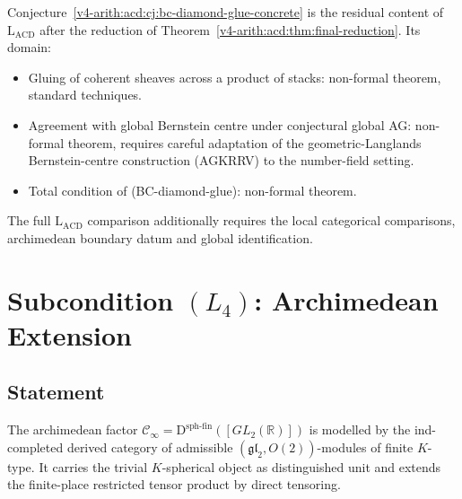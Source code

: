 \begin{remark}
\label{v4-arith:acd:rem:L3-residual-domain}
Conjecture~\ref{v4-arith:acd:cj:bc-diamond-glue-concrete} is the residual
content of \(\mathrm{L}_{\mathrm{ACD}}\) after the reduction of
Theorem~\ref{v4-arith:acd:thm:final-reduction}. Its domain:
\begin{itemize}
\item Gluing of coherent sheaves across a product of stacks:
non-formal theorem, standard techniques.
\item Agreement with global Bernstein centre under conjectural
global AG: non-formal theorem, requires careful adaptation of
the geometric-Langlands Bernstein-centre construction (AGKRRV) to the
number-field setting.
\item Total condition of (BC-diamond-glue): non-formal theorem.
\end{itemize}
The full \(\mathrm{L}_{\mathrm{ACD}}\) comparison additionally requires
the local categorical comparisons, archimedean boundary datum and
global identification.
\end{remark}

\section{Subcondition \((L_{4})\): Archimedean Extension}
\label{v4-arith:acd:L4}

\subsection{Statement}

\begin{theorem}
\label{v4-arith:acd:thm:L4-closed}
The archimedean factor
\(\mathcal{C}_{\infty}=\mathrm{D}^{\mathrm{sph\text{-}fin}}([GL_{2}(\mathbb{R})])\)
is modelled by the ind-completed derived category of admissible
\((\mathfrak{gl}_{2},O(2))\)-modules of finite \(K\)-type.  It carries
the trivial \(K\)-spherical object as distinguished unit and extends
the finite-place restricted tensor product by direct tensoring.
\end{theorem}

